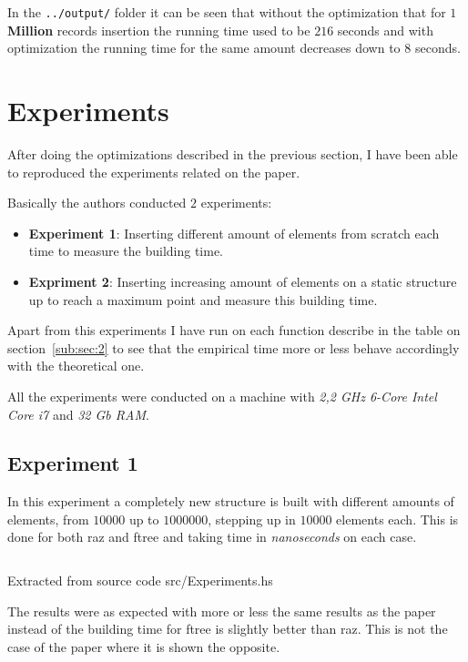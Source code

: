\documentclass[12pt, a4paper]{article}
\begin{document}
In the \texttt{../output/} folder it can be seen that without the optimization that for \textbf{$1$ Million} records insertion the running time used to be $216$ seconds and with optimization the running time for the same amount decreases down to $8$ seconds.

\section{Experiments}
After doing the optimizations described in the previous section, I have been able to reproduced the experiments related on the paper.

Basically the authors conducted $2$ experiments:

\begin{itemize}
 \item \textbf{Experiment 1}: Inserting different amount of elements from scratch each time to measure the building time.
 \item \textbf{Expriment 2}: Inserting increasing amount of elements on a static structure up to reach a maximum point and measure this building time.
\end{itemize}

Apart from this experiments I have run on each function describe in the table on section~\ref{sub:sec:2} to see that the empirical time more or less behave accordingly with the theoretical one.

All the experiments were conducted on a machine with \textit{2,2 GHz 6-Core Intel Core i7} and \textit{32 Gb RAM}.

\subsection{Experiment 1}
In this experiment a completely new structure is built with different amounts of elements, from $10000$ up to $1000000$, stepping up in $10000$ elements each. This is done for both \acrshort{raz} and \acrshort{ftree} and taking time in \textit{nanoseconds} on each case.

\begin{listing}[H]
  \inputminted[firstline=51, lastline=57, breaklines]{haskell}{../src/Experiments.hs}
  \caption{Extracted from source code src/Experiments.hs}
  \label{src:rac:5}
\end{listing}

The results were as expected with more or less the same results as the paper instead of the building time for \acrshort{ftree} is slightly better than \acrshort{raz}. This is not the case of the paper where it is shown the opposite.
\end{document}
